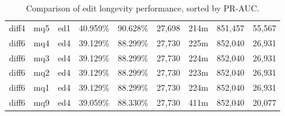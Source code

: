 \begin{sidewaystable}[!ph]
\begin{center}
\begin{tabular}{|c|c|c||c|c||c|c|c|c|}
diff4 & mq5 & ed1 & 40.959\% & 90.628\% & 27,698 & 214m & 851,457 & 55,567 \\
diff6 & mq4 & ed4 & 39.129\% & 88.299\% & 27,730 & 225m & 852,040 & 26,931 \\
diff6 & mq3 & ed4 & 39.129\% & 88.299\% & 27,730 & 224m & 852,040 & 26,931 \\
diff6 & mq2 & ed4 & 39.129\% & 88.299\% & 27,730 & 223m & 852,040 & 26,931 \\
diff6 & mq1 & ed4 & 39.129\% & 88.299\% & 27,730 & 224m & 852,040 & 26,931 \\
diff6 & mq9 & ed4 & 39.059\% & 88.330\% & 27,730 & 411m & 852,040 & 20,077 \\
\hline
\end{tabular}
\end{center}
\caption{Comparison of edit longevity performance,
    sorted by PR-AUC.}
\label{tab:editshoutH}
\end{sidewaystable}
\clearpage
